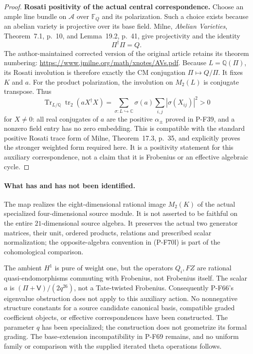 \begin{proof}
\par\medskip\noindent\textbf{Rosati positivity of the actual central correspondence.}
Choose an ample line bundle on $\mathcal A$ over $\mathbb F_Q$
and its polarization.  Such a choice exists because an
abelian variety is projective over its base field.
Milne, \emph{Abelian Varieties}, Theorem~7.1, p.~10,
and Lemma~19.2, p.~41, give projectivity and the identity
\[
                          \Pi^\dagger\Pi=Q.
\]
The author-maintained corrected version of the original
article retains its theorem numbering:
\url{https://www.jmilne.org/math/xnotes/AVs.pdf}.
Because $L=\mathbb Q(\Pi)$, its Rosati involution is
therefore exactly the CM conjugation
$\Pi\mapsto Q/\Pi$.  It fixes $K$ and $a$.
For the product polarization, the involution on
$M_2(L)$ is conjugate transpose.  Thus
\[
 \operatorname{Tr}_{L/\mathbb Q}
       \operatorname{tr}_2(a X^\dagger X)
   =\sum_{\sigma:L\hookrightarrow\mathbb C}
          \sigma(a)\sum_{i,j}|\sigma(X_{ij})|^2>0
                                                               \tag{P-F70n}
\]
for $X\ne0$: all real conjugates of $a$ are the positive
$\alpha_\pm$ proved in P-F39, and a nonzero field entry
has no zero embedding.  This is compatible with the
standard positive Rosati trace form of Milne,
Theorem~17.3, p.~35, and explicitly proves the stronger
weighted form required here.  It is a positivity statement
for this auxiliary correspondence, not a claim that it
is Frobenius or an effective algebraic cycle.
\end{proof}

\paragraph{What has and has not been identified.}
The map realizes the eight-dimensional rational image
$M_2(K)$ of the actual specialized four-dimensional source
module.  It is not asserted to be faithful on the entire
$21$-dimensional source algebra.  It preserves the actual
two generator matrices, their unit, ordered products,
relations and prescribed scalar normalization; the
opposite-algebra convention in (P-F70l) is part of the
cohomological comparison.

The ambient $H^1$ is pure of weight one, but the operators
$Q_i,FZ$ are rational quasi-endomorphisms commuting with
Frobenius, not Frobenius itself.  The scalar $a$ is
$(\Pi+\mathsf V)/(2q^{26})$, not a Tate-twisted Frobenius.
Consequently P-F66's eigenvalue obstruction does not apply
to this auxiliary action.  No nonnegative structure
constants for a source candidate canonical basis, compatible
graded coefficient objects, or effective correspondences
have been constructed.  The parameter $q$ has been
specialized; the construction does not geometrize its
formal grading.  The base-extension incompatibility in
P-F69 remains, and no uniform family or comparison with
the supplied iterated theta operations follows.
